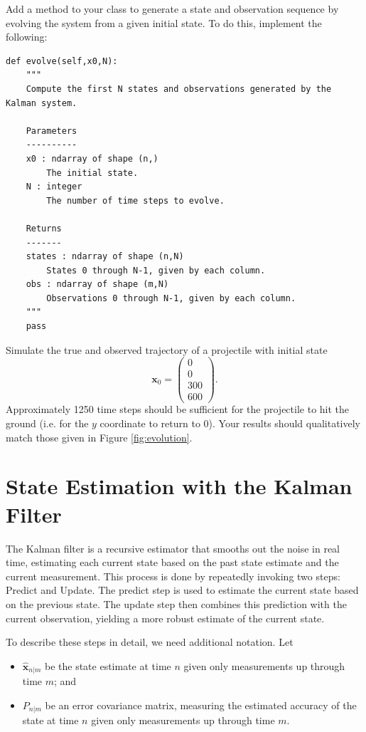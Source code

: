 \begin{problem}
Add a method to your  class to generate a state and observation sequence by evolving the system from a given initial state.
To do this, implement the following:
\begin{lstlisting}
def evolve(self,x0,N):
    """
    Compute the first N states and observations generated by the Kalman system.

    Parameters
    ----------
    x0 : ndarray of shape (n,)
        The initial state.
    N : integer
        The number of time steps to evolve.

    Returns
    -------
    states : ndarray of shape (n,N)
        States 0 through N-1, given by each column.
    obs : ndarray of shape (m,N)
        Observations 0 through N-1, given by each column.
    """
    pass
\end{lstlisting}

Simulate the true and observed trajectory of a projectile with initial state
\[
\mathbf{x}_0 = \left( \begin{array}{c} 0\\ 0 \\ 300 \\ 600\end{array} \right).
\]
Approximately 1250 time steps should be sufficient for the projectile to hit the ground (i.e. for the $y$ coordinate to return to 0).
Your results should qualitatively match those given in Figure \ref{fig:evolution}.
\label{prob:simulation}
\end{problem}



\section*{State Estimation with the Kalman Filter}
The Kalman filter is a recursive estimator that smooths out the noise in real time, estimating each current state based on the past state estimate and the current measurement.
This process is done by repeatedly invoking two steps: Predict and Update.
The predict step is used to estimate the current state based on the previous state.
The update step then combines this prediction with the current observation, yielding a more robust estimate of the current state.

To describe these steps in detail, we need additional notation. Let
\begin{itemize}
	\item $\widehat{\mathbf{x}}_{n|m}$ be the state estimate at time $n$ given only measurements up through time $m$; and
	\item $P_{n|m}$ be an error covariance matrix, measuring the estimated accuracy of the state at time $n$ given only measurements up through time $m$.
\end{itemize}

